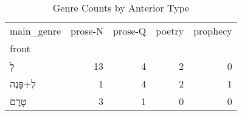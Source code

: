 \begin{table}[htbp!]
\centering
\caption{Genre Counts by Anterior Type}
\label{table:antgenre_ct}
\begin{tabular}{lrrrr}
\toprule
main\_genre &  prose-N &  prose-Q &  poetry &  prophecy \\
front     &          &          &         &           \\
\midrule
לְ        &       13 &        4 &       2 &         0 \\
לְ+פָּנֶה &        1 &        4 &       2 &         1 \\
טֶרֶם     &        3 &        1 &       0 &         0 \\
\bottomrule
\end{tabular}
\end{table}
